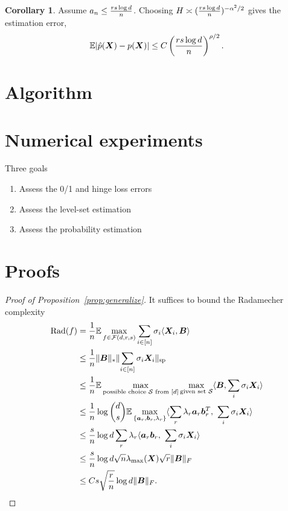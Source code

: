 \documentclass[11pt]{article}
\theoremstyle{definition}
\newtheorem{cor}[thm]{Corollary}
\begin{document}
\begin{cor} Assume $a_n \leq {rs\log d \over n}$. Choosing $H\asymp ({rs\log d \over n})^{-\alpha^2/2}$ gives the estimation error,
\[
\mathbb{E}|\hat p(\bm X)- p(\bm X)| \leq C\left({rs\log d \over n}\right)^{\rho/2}.
\]
\end{cor}

\section{Algorithm}

\section{Numerical experiments}
Three goals 
\begin{enumerate}
\item Assess the 0/1 and hinge loss errors
\item Assess the level-set estimation
\item Assess the probability estimation
\end{enumerate}

\section{Proofs}
\begin{proof}[Proof of Proposition~\ref{prop:generalize}]
It suffices to bound the Radamecher complexity 
\begin{align}
\text{Rad}(f)&={1\over n}\mathbb{E}\max_{f\in \mathcal{F}(d,r,s)}\sum_{i\in[n]}\sigma_i\langle \bm X_i, \bm B \rangle\\
&\leq {1\over n} \lVert\bm B\rVert_*\lVert\sum_{i\in[n]}\sigma_i\bm X_i\rVert_\text{sp}\\
&\leq {1\over n} \mathbb{E}\max_{\text{possible choice $\mathcal{S}$ from $[d]$}}\max_{\text{given set $\mathcal{S}$}} \langle \bm B, \sum_i\sigma_i\bm X_i\rangle\\
&\leq {1\over n}\log{{d}\choose{s}}\mathbb{E}\max_{\{\bm{a}_r,\bm{b}_r,\lambda_r\}}\langle \sum_r\lambda_r\bm{a}_r\bm{b}^T_r,\ \sum_i \sigma_i\bm X_i\rangle\\
&\leq {s\over n}\log d \sum_r \lambda_r \langle \bm{a}_r\bm{b}_r,\ \sum_i\sigma_i\bm X_i\rangle\\
&\leq {s\over n}\log d    \sqrt{n}\lambda_{\max}(\bm X)\sqrt{r}\lVert\bm B\rVert_F\\
&\leq Cs{\sqrt{r\over n}\log d}\lVert\bm B\rVert_F.
\end{align}
\end{proof}
\end{document}
